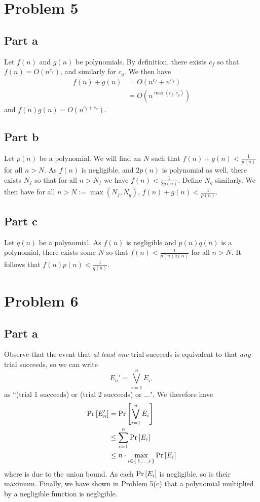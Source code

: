\documentclass{article}
\begin{document}
\section*{Problem 5}

\subsection*{Part a}

Let $f(n)$ and $g(n)$ be polynomials.
By definition, there exists $c_f$ so that $f(n) = O(n^{c_f})$,
and similarly for $c_g$.
We then have
\begin{align*}
    f(n)+g(n) &= O(n^{c_f} + n^{c_g}) \\ &=O(n^{\max(c_f, c_g)})
\end{align*} and $f(n)g(n) = O(n^{c_f+c_g})$.

\subsection*{Part b}

Let $p(n)$ be a polynomial.
We will find an $N$ such that $f(n)+g(n) < \frac{1}{p(n)}$ for all $n>N$.
As $f(n)$ is negligible, and $2p(n)$ is polynomial as well, there exists $N_f$ so that for all $n > N_f$ we have $f(n)<\frac{1}{2p(n)}$.
Define $N_g$ similarly.
We then have for all $n > N := \max(N_f, N_g)$, $f(n)+g(n)<\frac{1}{p(n)}$.

\subsection*{Part c}

Let $q(n)$ be a polynomial.
As $f(n)$ is negligible and $p(n)q(n)$ is a polynomial, there exists some $N$ so that $f(n) < \frac{1}{p(n) q(n)}$ for all $n > N$.
It follows that $f(n)p(n)<\frac{1}{q(n)}$.

\section*{Problem 6}

\subsection*{Part a}

Observe that the event that \emph{at least one} trial succeeds is equivalent to that \emph{any} trial succeeds, so we can write
\begin{equation*}
    E_n' = \bigvee_{i=1}^n E_i,
\end{equation*}
as ``(trial 1 succeeds) or (trial 2 succeeds) or ...".
We therefore have
\begin{align}
    \Pr\left[E_n'\right]&=\Pr\left[\bigvee_{i=1}^n E_i\right] \\
    &\leq \sum_{i=1}^n\Pr\left[E_i\right] \label{eq:union-bound} \\
    & \leq n \cdot \max_{i\in\set{1,\ldots, i}} \Pr\left[E_i\right]
\end{align}
where  is due to the union bound.
As each $\Pr\left[E_i\right]$ is negligible, so is their maximum.
Finally, we have shown in Problem 5(c) that a polynomial multiplied by a negligible function is negligible.
\end{document}
